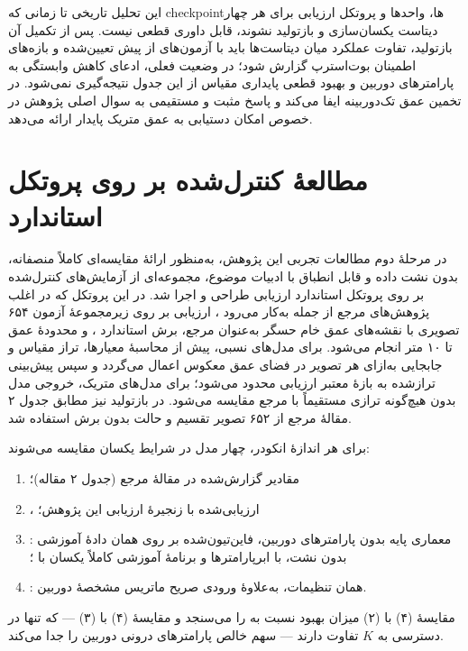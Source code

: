 این تحلیل تاریخی تا زمانی که checkpointها، واحدها و پروتکل ارزیابی برای هر چهار
دیتاست یکسان‌سازی و بازتولید نشوند، قابل داوری قطعی نیست. پس از تکمیل آن
بازتولید، تفاوت عملکرد \proposedmodel{} میان دیتاست‌ها باید با آزمون‌های از پیش
تعیین‌شده و بازه‌های اطمینان بوت‌استرپ گزارش شود؛ در وضعیت فعلی، ادعای کاهش
وابستگی به پارامترهای دوربین و بهبود قطعی پایداری مقیاس از این جدول نتیجه‌گیری
نمی‌شود.
در تخمین عمق تک‌دوربینه ایفا می‌کند
و پاسخ مثبت و مستقیمی
به سوال اصلی پژوهش
در خصوص امکان دستیابی به عمق متریک پایدار ارائه می‌دهد.

\section{مطالعهٔ کنترل‌شده بر روی پروتکل استاندارد }
\label{sec:controlled_nyu_study}

در مرحلهٔ دوم مطالعات تجربی این پژوهش، به‌منظور ارائهٔ مقایسه‌ای کاملاً منصفانه، بدون نشت داده و قابل انطباق با ادبیات موضوع، مجموعه‌ای از آزمایش‌های کنترل‌شده بر روی پروتکل استاندارد ارزیابی  طراحی و اجرا شد. در این پروتکل که در اغلب پژوهش‌های مرجع از جمله  به‌کار می‌رود \cite{Eigen2014Depth, DepthAnythingV2}، ارزیابی بر روی زیرمجموعهٔ آزمون ۶۵۴ تصویری  با نقشه‌های عمق خام حسگر به‌عنوان مرجع، برش استاندارد ، و محدودهٔ عمق  تا ۱۰ متر انجام می‌شود. برای مدل‌های نسبی، پیش از محاسبهٔ معیارها، تراز مقیاس و جابجایی به‌ازای هر تصویر در فضای عمق معکوس اعمال می‌گردد و سپس پیش‌بینی تراز‌شده به بازهٔ معتبر ارزیابی محدود می‌شود؛ برای مدل‌های متریک، خروجی مدل بدون هیچ‌گونه ترازی مستقیماً با مرجع مقایسه می‌شود. در بازتولید  نیز مطابق جدول ۲ مقالهٔ مرجع از ۶۵۲ تصویر تقسیم  و حالت بدون برش استفاده شد.

برای هر اندازهٔ انکودر، چهار مدل در شرایط یکسان مقایسه می‌شوند:
\begin{enumerate}
    \item مقادیر گزارش‌شده در مقالهٔ مرجع  (جدول ۲ مقاله)؛
    \item \publishedbasemodel{}، ارزیابی‌شده با زنجیرهٔ ارزیابی این پژوهش؛
    \item \emph{\controlmodel{}}: معماری پایه بدون پارامترهای دوربین، فاین‌تیون‌شده بر روی همان دادهٔ آموزشی بدون نشت، با ابرپارامترها و برنامهٔ آموزشی کاملاً یکسان با \proposedmodel{}؛
    \item \proposedmodel{}: همان تنظیمات، به‌علاوهٔ ورودی صریح ماتریس مشخصهٔ دوربین.
\end{enumerate}
مقایسهٔ (۴) با (۲) میزان بهبود نسبت به \publishedbasemodel{} را می‌سنجد و مقایسهٔ (۴) با (۳) --- که تنها در دسترسی به $K$ تفاوت دارند --- سهم خالص پارامترهای درونی دوربین را جدا می‌کند.

